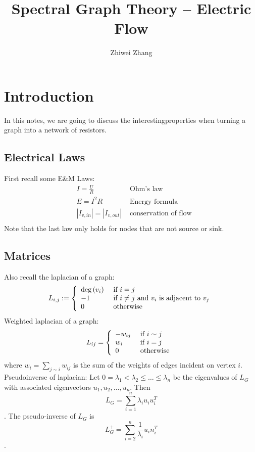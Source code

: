 \documentclass[12pt]{article}
\begin{document}
 
 
 
\title{Spectral Graph Theory -- Electric Flow}
\author{Zhiwei Zhang}

 
\maketitle
\section{Introduction}
In this notes, we are going to discuss the interestingproperties when turning a graph into a network of resistors.

\subsection{Electrical Laws}
First recall some E\&M Laws:
\begin{align*}
&I = \frac{U}{R} & \text{ Ohm's law}\\
&E = I^2R &\text{ Energy formula}\\
&|I_{v, in}| = |I_{v, out}| & \text{ conservation of flow}\\
\end{align*}
Note that the last law only holds for nodes that are not source or sink.

\subsection{Matrices}
Also recall the laplacian of a graph:
$$L _ { i , j } : = \left\{ \begin{array} { l l } { \operatorname { deg } \left( v _ { i } \right) } & { \text { if } i = j } \\ { - 1 } & { \text { if } i \neq j \text { and } v _ { i } \text { is adjacent to } v _ { j } } \\ { 0 } & { \text { otherwise } } \end{array} \right.$$
Weighted laplacian of a graph:
$$
L _ { i j } = \left\{ \begin{array} { l l } { - w _ { i j } } & { \text { if } i \sim j } \\ { w _ { i } } & { \text { if } i = j } \\ { 0 } & { \text { otherwise } } \end{array} \right.
$$
where $w _ { i } = \sum _ { j \sim i } w _ { i j }$ is the sum of the weights of edges incident on vertex $i$.\\
\newline
Pseudoinverse of laplacian:
Let $0 = \lambda _ { 1 } < \lambda _ { 2 } \leqslant \ldots \leq \lambda _ { n }$ be the eigenvalues of  $L_G$ with associated eigenvectors $u _ { 1 } , u _ { 2 } , \ldots , u _ { n }$. Then $$L _ { G } = \sum _ { i = 1 } ^ { n } \lambda _ { i } u _ { i } u _ { i } ^ { T }$$. The pseudo-inverse of $L_G$ is $$L _ { G } ^ { + } = \sum _ { i = 2 } ^ { n } \frac { 1 } { \lambda _ { i } } u _ { i } n _ { i } ^ { T }$$.
\end{document}
